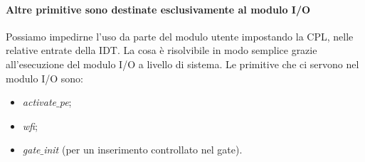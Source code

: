 \documentclass[11pt]{report}
\theoremstyle{definition}
\begin{document}
\paragraph{Altre primitive sono destinate esclusivamente al modulo I/O}  Possiamo impedirne l'uso da parte del modulo utente impostando la CPL, nelle relative entrate della IDT. La cosa è risolvibile in modo semplice grazie all'esecuzione del modulo I/O a livello di sistema. Le primitive che ci servono nel modulo I/O sono:
\begin{itemize}
	\item \emph{activate$\_$pe};
	\item \emph{wfi};
	\item \emph{gate$\_$init} (per un inserimento controllato nel gate).
\end{itemize}
\clearpage
\end{document}
